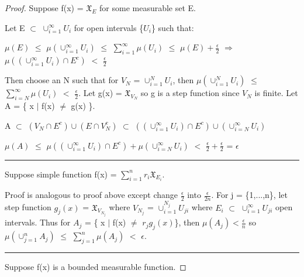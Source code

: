     \begin{proof}
        Suppose f(x) = $\mathfrak{X}_{E}$ for some measurable set E.

        Let E $\subset$ $\cup_{i=1}^{\infty} U_i$ for open intervals
        \{$U_i$\} such that:

        \hspace{0.5cm}
        $\mu(E)$
        $\leq$ $\mu(\cup_{i=1}^{\infty} U_i)$
        $\leq$ $\sum_{i=1}^{\infty} \mu(U_i)$
        $\leq$ $\mu(E) + \frac{\epsilon}{2}$
        \hspace{0.5cm}
        $\Rightarrow$
        \hspace{0.5cm}
        $\mu((\cup_{i=1}^{\infty} U_i) \cap E^c)$ $<$ $\frac{\epsilon}{2}$

        Then choose an N such that for $V_N$ = $\cup_{i=1}^N U_i$,
        then $\mu(\cup_{i=1}^N U_i)$ $\leq$ $\sum_{i=N}^{\infty} \mu(U_i)$
        $<$ $\frac{\epsilon}{2}$.
        Let g(x) = $\mathfrak{X}_{V_N}$ so g is a step function since $V_N$
        is finite.
        Let A = \{ x $|$ f(x) $\not =$ g(x) \}.

        \hspace{0.5cm}
        A $\subset$ $(V_N \cap E^c) \cup (E \cap V_N^c)$
        $\subset$ $((\cup_{i=1}^{\infty} U_i) \cap E^c)
                    \cup (\cup_{i=N}^{\infty} U_i)$

        \hspace{0.5cm}
        $\mu(A)$ $\leq$ $\mu((\cup_{i=1}^{\infty} U_i) \cap E^c)
                        + \mu(\cup_{i=N}^{\infty} U_i)$
        $<$ $\frac{\epsilon}{2} + \frac{\epsilon}{2}$
        = $\epsilon$

        \rule[0.1cm]{15.2cm}{0.01cm}

        Suppose simple function f(x) = $\sum_{i=1}^n r_i \mathfrak{X}_{E_i}$.

        Proof is analogous to proof above except change $\frac{\epsilon}{2}$
        into $\frac{\epsilon}{2n}$.
        For j = \{1,...,n\}, let step function
        $g_j(x)$ = $\mathfrak{X}_{V_{N_j}}$
        where $V_{N_j}$ = $\cup_{i=1}^{N_j} U_{ji}$ where $E_i$ $\subset$
        $\cup_{i=1}^{\infty} U_{ji}$ open intervals.
        Thus for $A_j$ = \{ x $|$ f(x) $\not =$ $r_j g_j(x)$\},
        then $\mu(A_j) < \frac{\epsilon}{n}$
        so $\mu(\cup_{j=1}^n A_j)$
        $\leq$ $\sum_{j=1}^n \mu(A_j)$
        $<$ $\epsilon$.

        \rule[0.1cm]{15.2cm}{0.01cm}

        Suppose f(x) is a bounded measurable function.


\end{proof}
